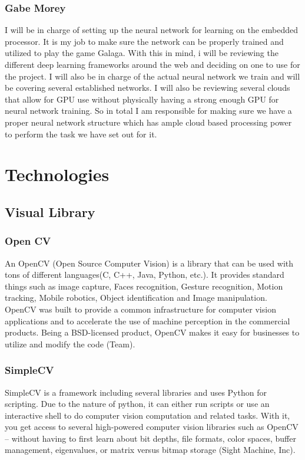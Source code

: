 \documentclass{scrreprt}
\begin{document}
\subsection{Gabe Morey}
I will be in charge of setting up the neural network for learning on the embedded processor. It is
my job to make sure the network can be properly trained and utilized to play the game Galaga.
With this in mind, i will be reviewing the different deep learning frameworks around the web
and deciding on one to use for the project. I will also be in charge of the actual neural network
we train and will be covering several established networks. I will also be reviewing several
clouds that allow for GPU use without physically having a strong enough GPU for neural
network training. So in total I am responsible for making sure we have a proper neural network
structure which has ample cloud based processing power to perform the task we have set out for
it.

\chapter{Technologies}
\section{Visual Library}
\subsection{Open CV}
An OpenCV (Open Source Computer Vision) is a library that can be used with tons of different languages(C, C++, Java, Python, etc.).
 It provides standard things such as image capture, Faces recognition, Gesture recognition, Motion tracking, Mobile robotics, Object identification and Image manipulation.
 OpenCV was built to provide a common infrastructure for computer vision applications and to accelerate the use of machine perception in the commercial products.
 Being a BSD-licensed product, OpenCV makes it easy for businesses to utilize and modify the code (Team).
\subsection{SimpleCV}
SimpleCV is a framework including several libraries and uses Python for scripting.
Due to the nature of python, it can either run scripts or use an interactive shell to do computer vision computation and related tasks.
With it, you get access to several high-powered computer vision libraries such as OpenCV – without having to first learn about bit depths,
file formats, color spaces, buffer management, eigenvalues, or matrix versus bitmap storage (Sight Machine, Inc).
\end{document}
